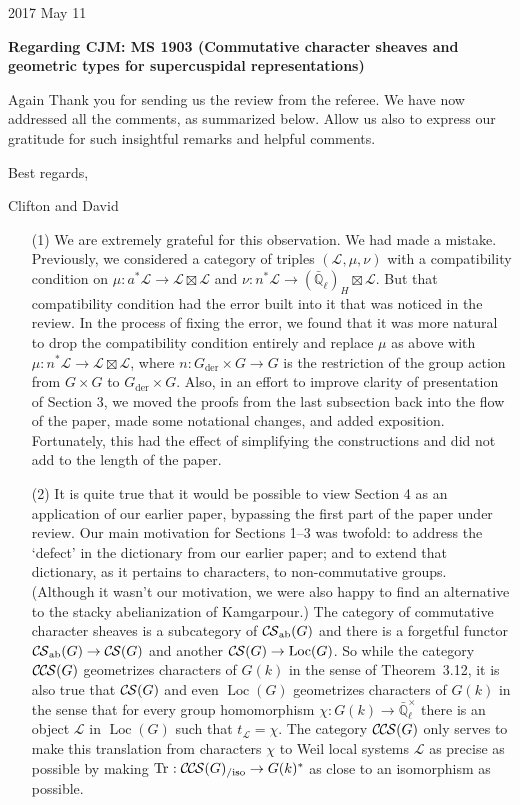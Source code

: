 \documentclass[letter,10pt]{amsart}
\theoremstyle{plain}
\theoremstyle{definition}
\newcommand{\EE}{\mathbb{\bar Q}_\ell}
\newcommand{\Fq}{k}
\newcommand{\EEx}{\EE^\times}
\DeclareMathOperator{\Loc}{Loc}
\newcommand{\der}{_{\operatorname{der}}}
\newcommand{\ab}{_{\operatorname{ab}}}
\newcommand{\trFrob}[1]{t_{#1}}
\DeclareMathOperator{\Tr}{Tr}
\newcommand{\TrFrob}[1]{\Tr_{#1}}
\newcommand{\cs}[1]{{\mathcal{#1}}}
\newcommand{\CS}{{\mathcal{C\hskip-0.8pt S}}}
\newcommand{\CCS}{{\mathcal{C\hskip-.8pt C\hskip-0.8pt S}}}
\newcommand{\CCSiso}[1]{\CCS(#1)_{/\text{iso}}}
\begin{document}
{\hfill {2017 May 11} \\ 
}

\setcounter{equation}{-1}


\noindent\textbf{Regarding CJM: MS 1903 (Commutative character sheaves and geometric types for supercuspidal representations)} %

\bigskip

\medskip

Again
Thank you for sending us the review from the referee. We have now addressed all the comments, as summarized below. Allow us also to express our gratitude for such  insightful remarks and helpful comments.
\medskip

Best  regards,
\bigskip

Clifton and David

\bigskip

\begin{enumerate}
\item[(1)] We are extremely grateful for this observation. We had made a mistake. Previously, we considered a category of triples $(\cs{L},\mu,\nu)$ with a compatibility condition on $\mu : a^*\cs{L} \to \cs{L}\boxtimes\cs{L}$ and $\nu : n^* \cs{L}\to (\EE)_{H}\boxtimes \cs{L}$. But that compatibility condition had the error built into it that was noticed in the review. In the process of fixing the error, we found that it was more natural to drop the compatibility condition entirely and replace $\mu$ as above with $\mu : n^*\cs{L} \to \cs{L}\boxtimes\cs{L}$, where $n: G\der\times G\to G$ is the restriction of the group action from $G\times G$ to $G\der\times G$. Also, in an effort to improve clarity of presentation of Section 3, we moved the proofs from the last subsection back into the flow of the paper, made some notational changes, and added exposition.
Fortunately, this had the effect of simplifying the constructions and did not add to the length of the paper. 
\item[(2)] It is quite true that it would be possible to view Section 4 as an application of our earlier paper, bypassing the first part of the paper under review. Our main motivation for Sections 1--3 was twofold: to address the `defect' in the dictionary from our earlier paper; and to extend that dictionary, as it pertains to characters, to non-commutative groups. (Although it wasn't our motivation, we were also happy to find an alternative to the stacky abelianization of Kamgarpour.) 
The category of commutative character sheaves is a subcategory of $\CS\ab(G)$ and there is a forgetful functor $\CS\ab(G) \to \CS(G)$ and another $\CS(G)\to \Loc(G)$.
So while the category $\CCS(G)$ geometrizes characters of $G(\Fq)$ in the sense of Theorem~3.12, it is also true that $\CS(G)$ and even $\Loc(G)$ geometrizes characters of $G(\Fq)$ in the sense that for every group homomorphism $\chi : G(\Fq) \to \EEx$ there is an object $\cs{L}$ in $\Loc(G)$ such that $\trFrob{\cs{L}} = \chi$.
The category $\CCS(G)$ only serves to make this translation from characters $\chi$ to Weil local systems $\cs{L}$ as precise as possible by making $\TrFrob{} : \CCSiso{G} \to G(k)^*$ as close to an isomorphism as possible.
\end{enumerate}
\end{document}
